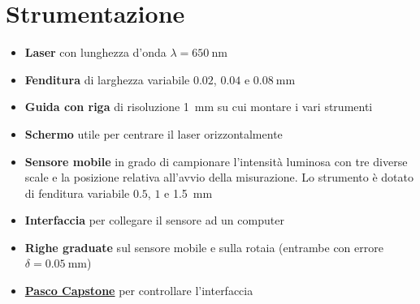 \documentclass[../main.tex]{subfiles}
\begin{document}
\section{Strumentazione}

\begin{itemize}
    \item \textbf{Laser} con lunghezza d'onda $\lambda = \qty{650}{\nano\meter}$
    \item \textbf{Fenditura} di larghezza variabile $0.02$, $0.04$ e $\qty{0.08}{\milli\meter}$
    \item \textbf{Guida con riga} di risoluzione \qty{1}{\milli\meter} su cui montare i vari strumenti
    \item \textbf{Schermo} utile per centrare il laser orizzontalmente
    \item \textbf{Sensore mobile} in grado di campionare l'intensità luminosa con tre diverse scale e la posizione relativa all'avvio della misurazione. Lo strumento è dotato di fenditura variabile $0.5$, $1$ e \qty{1.5}{\milli\meter}
    \item \textbf{Interfaccia} per collegare il sensore ad un computer
    \item \textbf{Righe graduate} sul sensore mobile e sulla rotaia (entrambe con errore $\delta = \qty{0.05}{\milli\meter}$)
    \item \textbf{\href{https://www.pasco.com/downloads/capstone}{Pasco Capstone}} per controllare l'interfaccia
\end{itemize}
\end{document}
